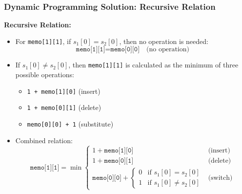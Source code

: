 \documentclass[10pt,aspectratio=43]{beamer}
\begin{document}
\begin{frame}
    \frametitle{Dynamic Programming Solution: Recursive Relation}

    \textbf{Recursive Relation:}
    \begin{itemize}
        \item For \texttt{memo[1][1]}, if $s_1[0] = s_2[0]$, then no operation is needed:
        \[
        \texttt{memo[1][1]} = \texttt{memo[0][0]} \quad \text{(no operation)}
        \]

        \item If $s_1[0] \neq s_2[0]$, then \texttt{memo[1][1]} is calculated as the minimum of three possible operations:
        \begin{itemize}
            \item \texttt{1 + memo[1][0]} \hspace{1em} (insert)
            \item \texttt{1 + memo[0][1]} \hspace{1em} (delete)
            \item \texttt{memo[0][0] + 1} \hspace{1em} (substitute)
        \end{itemize}

        \item Combined relation:
        \[
        \texttt{memo[1][1]} = 
        \min 
        \begin{cases} 
            1 + \texttt{memo[1][0]} & \text{(insert)} \\
            1 + \texttt{memo[0][1]} & \text{(delete)} \\
            \texttt{memo[0][0]} + 
            \begin{cases}
                0 & \text{if } s_1[0] = s_2[0] \\
                1 & \text{if } s_1[0] \neq s_2[0]
            \end{cases} & \text{(switch)}
        \end{cases}
        \]
    \end{itemize}
\end{frame}
\end{document}
